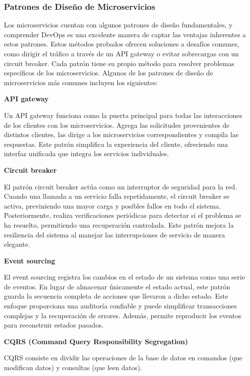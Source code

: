 \documentclass[12pt]{book}
\begin{document}
\subsubsection*{Patrones de Diseño de Microservicios}

Los microservicios cuentan con algunos patrones de diseño fundamentales, y comprender DevOps es una excelente manera de captar las ventajas inherentes a estos patrones. Estos métodos probados ofrecen soluciones a desafíos comunes, como dirigir el tráfico a través de un API gateway o evitar sobrecargas con un circuit breaker. Cada patrón tiene su propio método para resolver problemas específicos de los microservicios. 
Algunos de los patrones de diseño de microservicios más comunes incluyen los siguientes:

\textbf{API gateway}

Un API gateway funciona como la puerta principal para todas las interacciones de los clientes con los microservicios. Agrega las solicitudes provenientes de distintos clientes, las dirige a los microservicios correspondientes y compila las respuestas. Este patrón simplifica la experiencia del cliente, ofreciendo una interfaz unificada que integra los servicios individuales.

\textbf{Circuit breaker}

El patrón circuit breaker actúa como un interruptor de seguridad para la red. Cuando una llamada a un servicio falla repetidamente, el circuit breaker se activa, previniendo una mayor carga y posibles fallos en todo el sistema. Posteriormente, realiza verificaciones periódicas para detectar si el problema se ha resuelto, permitiendo una recuperación controlada. Este patrón mejora la resiliencia del sistema al manejar las interrupciones de servicio de manera elegante.

\textbf{Event sourcing}

El event sourcing registra los cambios en el estado de un sistema como una serie de eventos. En lugar de almacenar únicamente el estado actual, este patrón guarda la secuencia completa de acciones que llevaron a dicho estado. Este enfoque proporciona una auditoría confiable y puede simplificar transacciones complejas y la recuperación de errores. Además, permite reproducir los eventos para reconstruir estados pasados.

\textbf{CQRS (Command Query Responsibility Segregation)}

CQRS consiste en dividir las operaciones de la base de datos en comandos (que modifican datos) y consultas (que leen datos). 
\end{document}
